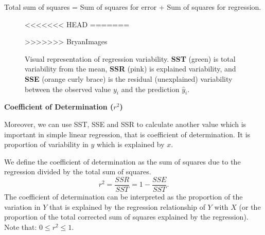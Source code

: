 Total sum of squares = Sum of squares for error + Sum of squares for regression.

\begin{figure}[H]
\begin{center}
<<<<<<< HEAD
=======
\end{center}
>>>>>>> BryanImages
\caption{Visual representation of regression variability. \textbf{SST} (green) is total variability from the mean, \textbf{SSR} (pink) is explained variability, and \textbf{SSE} (orange curly brace) is the residual (unexplained) variability between the observed value $y_i$ and the prediction $\hat{y}_i$.}
\end{figure}

\textbf{Coefficient of Determination ($r^2$)}

Moreover, we can use SST, SSE and SSR to calculate another value which is important in simple linear regression, that is coefficient of determination. It is proportion of variability in $y$ which is explained by $x$.

\begin{definition}
We define the coefficient of determination as the sum of squares due to the regression divided by the total sum of squares. $$r^2 = \frac{SSR}{SST} = 1 - \frac{SSE}{SST}.$$
The coefficient of determination can be interpreted as the proportion of the variation in $Y$ that is explained by the regression relationship of $Y$ with $X$ (or the proportion of the total corrected sum of squares explained by the regression). Note that: $0 \leq r^2 \leq 1.$
\end{definition}